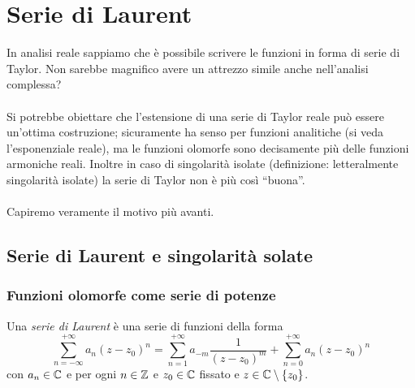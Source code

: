 \chapter{Serie di Laurent}
In analisi reale sappiamo che è possibile scrivere le funzioni in forma di serie di Taylor. Non sarebbe magnifico avere un attrezzo simile anche nell'analisi complessa? \\ \\ Si potrebbe obiettare che l'estensione di una serie di Taylor reale può essere un'ottima costruzione; sicuramente ha senso per funzioni analitiche (si veda l'esponenziale reale), ma le funzioni olomorfe sono decisamente più delle funzioni armoniche reali. Inoltre in caso di singolarità isolate (definizione: letteralmente singolarità isolate) la serie di Taylor non è più così \enquote{buona}. \\ \\ Capiremo veramente il motivo più avanti.
\newpage
\section{Serie di Laurent e singolarità solate}
\subsection{\textcolor{AnComp}{\textbf{Funzioni olomorfe come serie di potenze}}}

\begin{definition}
  Una \emph{serie di Laurent} è una serie di funzioni della forma 
  \begin{equation*}
    \sum_{n=-\infty}^{+\infty} a_n(z-z_0)^n = \sum_{n=1}^{+\infty} a_{-m}
            \frac{1}{(z-z_0)^m} + \sum_{n=0}^{+\infty} a_n(z - z_0)^{n}
  \end{equation*}
con $a_n \in \mathbb{C}$ e per ogni $n \in \mathbb{Z}$ e $z_0 \in \mathbb{C}$ fissato e $z\in \mathbb{C}
\setminus \left\{ z_0 \right\}$.
  \label{def:serie_laurent}
\end{definition}

